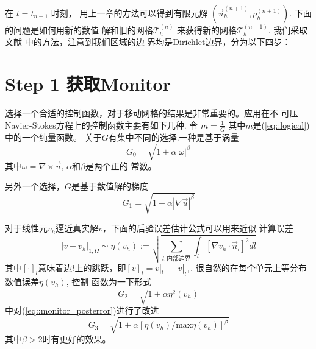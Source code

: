 \documentclass{report}
\theoremstyle{Remark}
\begin{document}
   在 $t = t_{n + 1}$ 时刻， 用上一章的方法可以得到有限元解
   $(\vec{u}_h^{(n + 1)}, p_h^{(n + 1)})$. 下面的问题是如何用新的数值
   解和旧的网格$\mathcal {T}_h^{(n)}$ 来获得新的网格$\mathcal {T}_h^{(n +
   1)}$. 我们采取文献 \cite{di2005moving} 中的方法，注意到我们区域的边
   界均是Dirichlet边界，分为以下四步：
   \section{Step 1 获取Monitor}
     选择一个合适的控制函数，对于移动网格的结果是非常重要的。应用在不
     可压Navier-Stokes方程上的控制函数主要有如下几种.
     令 $m = \frac{1}{G}$ 其中$m$是(\ref{eq::logical})中的一个纯量函数。
     关于$G$有集中不同的选择.一种是基于涡量
     \begin{equation}
       G_0 = \sqrt{1 + \alpha |\omega|^\beta}
       \label{eq::monitor_vorticity}
     \end{equation}
     其中$\omega = \nabla \times \vec{u}$, $\alpha$和$\beta$是两个正的
     常数。
     
      另外一个选择，$G$是基于数值解的梯度
      \begin{equation}
        G_1 = \sqrt{1 + \alpha |\nabla \vec{u}|^\beta}
        \label{eq::monitor_gradient}
      \end{equation}
      
      对于线性元$v_h$逼近真实解$v$，下面的后验误差估计公式可以用来近似
      计算误差
      \begin{equation}
        |v - v_h|_{1, \Omega} \sim \eta(v_h) := \sqrt{\sum\limits_{l:
            \text{内部边界}} \int_l \left[ \nabla v_h \cdot \vec{n}_l
            \right]^2 dl}
      \end{equation}
      其中$[\cdot]_l$意味着边$l$上的跳跃，即$[v]_l = v|_{l^{+}} -
      v|_{l^{+}}$. 很自然的在每个单元上等分布数值误差$\eta(v_h)$, 控制
      函数为一下形式
      \begin{equation}
        G_2 = \sqrt{1 + \alpha \eta^2(v_h)}
        \label{eq::monitor_posterror}
      \end{equation}
      \cite{di2005moving}中对(\ref{eq::monitor_posterror})进行了改进
      \begin{equation}
        G_3 = \sqrt{1 + \alpha \left[ \eta(v_h) / \text{max}\eta(v_h)
          \right]^\beta}
        \label{eq::monitor_posterror_modified}
      \end{equation}
      其中$\beta > 2$时有更好的效果。
\end{document}
